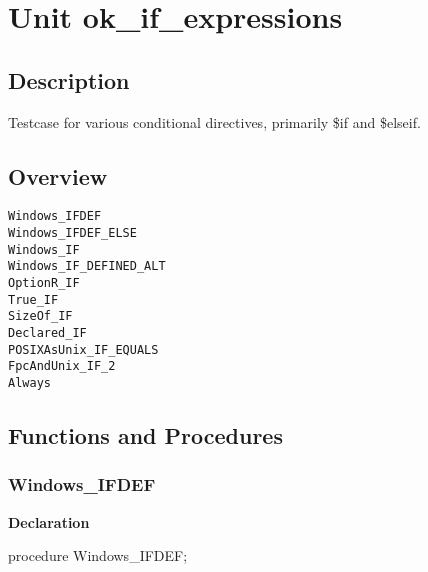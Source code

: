 \documentclass{report}
\newif\ifpdf
\begin{document}
\label{toc}\tableofcontents
\newpage
\newlength{\tmplength}
\chapter{Unit ok{\_}if{\_}expressions}
\label{ok_if_expressions}
\section{Description}
Testcase for various conditional directives, primarily {\$}if and {\$}elseif.
\section{Overview}
\begin{description}
\item[\texttt{Windows{\_}IFDEF}]
\item[\texttt{Windows{\_}IFDEF{\_}ELSE}]
\item[\texttt{Windows{\_}IF}]
\item[\texttt{Windows{\_}IF{\_}DEFINED{\_}ALT}]
\item[\texttt{OptionR{\_}IF}]
\item[\texttt{True{\_}IF}]
\item[\texttt{SizeOf{\_}IF}]
\item[\texttt{Declared{\_}IF}]
\item[\texttt{POSIXAsUnix{\_}IF{\_}EQUALS}]
\item[\texttt{FpcAndUnix{\_}IF{\_}2}]
\item[\texttt{Always}]
\end{description}
\section{Functions and Procedures}
\ifpdf
\subsection*{\large{\textbf{Windows{\_}IFDEF}}\normalsize\hspace{1ex}\hrulefill}
\else
\subsection*{Windows{\_}IFDEF}
\fi
\label{ok_if_expressions-Windows_IFDEF}
\begin{list}{}{
\setlength{\itemindent}{0cm}
\setlength{\listparindent}{0cm}
\setlength{\leftmargin}{\evensidemargin}
\addtolength{\leftmargin}{\tmplength}
\settowidth{\labelsep}{X}
\addtolength{\leftmargin}{\labelsep}
\setlength{\labelwidth}{\tmplength}
}
\item[\textbf{Declaration}\hfill]
\ifpdf
\begin{flushleft}
\fi
\begin{ttfamily}
procedure Windows{\_}IFDEF;\end{ttfamily}

\ifpdf
\end{flushleft}
\fi

\end{list}
\ifpdf
\end{document}
